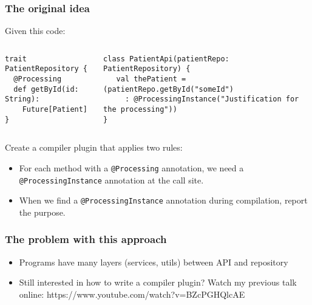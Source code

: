 \documentclass[aspectratio=169]{beamer}
\begin{document}

\begin{frame}[fragile]
  \frametitle{The original idea}

Given this code: 
\begin{columns}
\begin{column}{0.3\textwidth}

\begin{lstlisting}[style=myScalastyle,frame=none]
trait PatientRepository {
  @Processing
  def getById(id: String):
    Future[Patient]
}
\end{lstlisting}


\end{column}

\begin{column}{0.7\textwidth}  

\begin{lstlisting}[style=myScalastyle,frame=none]
class PatientApi(patientRepo: PatientRepository) {
   val thePatient = (patientRepo.getById("someId")
     : @ProcessingInstance("Justification for the processing"))
}
\end{lstlisting}

\end{column}
\end{columns}

Create a compiler plugin that applies two rules:
\begin{itemize}
  \item For each method with a \texttt{@Processing} annotation, we need a \texttt{@ProcessingInstance} annotation at the call site.
  \item When we find a \texttt{@ProcessingInstance} annotation during compilation, report the purpose.
\end{itemize}

\end{frame}

\begin{frame}
  \frametitle{The problem with this approach}
  
  \begin{itemize}
    \item Programs have many layers (services, utils) between API and repository
    \pause
    \item Still interested in how to write a compiler plugin? Watch my previous talk online: https://www.youtube.com/watch?v=BZcPGHQlcAE
  \end{itemize}
\end{frame}
\end{document}
